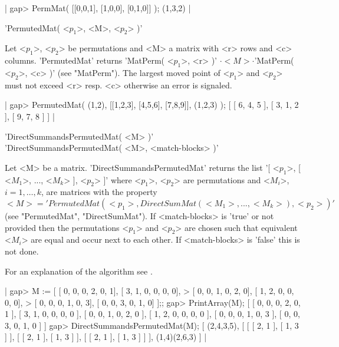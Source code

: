 |    gap> PermMat( [[0,0,1], [1,0,0], [0,1,0]] );
    (1,3,2) |


'PermutedMat( <$p_1$>, <M>, <$p_2$> )'

Let <$p_1$>, <$p_2$> be permutations and <M> a matrix 
with <r> rows and <c> columns.
'PermutedMat' returns 'MatPerm( <$p_1$>, <r> )'
$\cdot <M>\cdot$'MatPerm( <$p_2$>, <c> )' (see "MatPerm").
The largest moved point of <$p_1$> and <$p_2$> must 
not exceed <r> resp. <c> otherwise an error is signaled.

|    gap> PermutedMat( (1,2), [[1,2,3], [4,5,6], [7,8,9]], (1,2,3) );
    [ [ 6, 4, 5 ], [ 3, 1, 2 ], [ 9, 7, 8 ] ] |


'DirectSummandsPermutedMat( <M> )'\\
'DirectSummandsPermutedMat( <M>, <match-blocks> )'

Let <M> be a matrix. 'DirectSummandsPermutedMat' returns the list 
'[ <$p_1$>, [ <$M_1$>, ..., <$M_k$> ], <$p_2$> ]' where 
<$p_1$>, <$p_2$> are permutations and <$M_i$>, $i = 1,\dots,k$, are 
matrices with the property 
$<M> = 'PermutedMat( <p_1>, DirectSumMat( <M_1>, ..., <M_k> ), 
<p_2> )'$ (see "PermutedMat", "DirectSumMat").
If <match-blocks> is 'true' or not provided then the permutations
<$p_1$> and <$p_2$> are chosen such that equivalent <$M_i$>
are equal and occur next to each other.
If <match-blocks> is 'false' this is not done.

For an explanation of the algorithm see \cite{Egn97}.

|    gap> M := [ [ 0, 0, 0, 2, 0, 1], [ 3, 1, 0, 0, 0, 0], 
     > [ 0, 0, 1, 0, 2, 0], [ 1, 2, 0, 0, 0, 0], 
     > [ 0, 0, 0, 1, 0, 3], [ 0, 0, 3, 0, 1, 0] ];;
    gap> PrintArray(M);                                                       
    [ [  0,  0,  0,  2,  0,  1 ],
      [  3,  1,  0,  0,  0,  0 ],
      [  0,  0,  1,  0,  2,  0 ],
      [  1,  2,  0,  0,  0,  0 ],
      [  0,  0,  0,  1,  0,  3 ],
      [  0,  0,  3,  0,  1,  0 ] ]
    gap> DirectSummandsPermutedMat(M);
    [ (2,4,3,5), 
      [ [ [ 2, 1 ], [ 1, 3 ] ], 
        [ [ 2, 1 ], [ 1, 3 ] ], 
        [ [ 2, 1 ], [ 1, 3 ] ] ], 
      (1,4)(2,6,3) ] |


